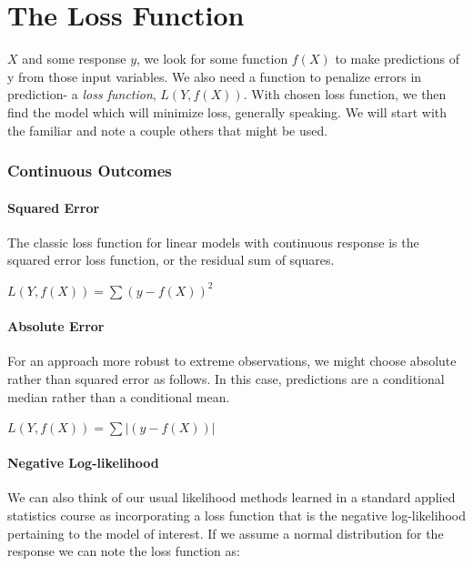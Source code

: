 \documentclass[english,nohyper,titlepage]{tufte-handout}
\begin{document}







\part{The Loss Function}
 $X$ and some response $y$, we look for some function $f(X)$ to make predictions of y from those input variables.  We also need a function to penalize errors in prediction- a \emph{loss function}, $L(Y, f(X))$.  With chosen loss function, we then find the model which will minimize loss, generally speaking.  We will start with the familiar and note a couple others that might be used.

\section{Continuous Outcomes}
\subsection{Squared Error}
The classic loss function for linear models with continuous response is the squared error loss function, or the residual sum of squares.

\vspace{.25cm}
\noindent$L(Y, f(X)) = \sum(y-f(X))^2$
\vspace{.25cm}

\subsection{Absolute Error}
For an approach more robust to extreme observations, we might choose absolute rather than squared error as follows.  In this case, predictions are a conditional median rather than a conditional mean.

\vspace{.25cm}
\noindent$L(Y, f(X)) = \sum|(y-f(X))|$
\vspace{.25cm}

\subsection{Negative Log-likelihood}
We can also think of our usual likelihood methods learned in a standard applied statistics course as incorporating a loss function that is the negative log-likelihood pertaining to the model of interest.  If we assume a normal distribution for the response we can note the loss function as:
\end{document}
